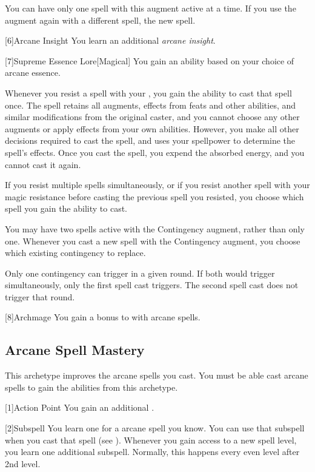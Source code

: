         You can have only one spell with this augment active at a time.
        If you use the augment again with a different spell, the new spell.

        [6]{Arcane Insight}
        You learn an additional \textit{arcane insight}.

        [7]{Supreme Essence Lore}[Magical]
        You gain an ability based on your choice of arcane essence.

         Whenever you resist a spell with your , you gain the ability to cast that spell once.
        The spell retains all augments, effects from feats and other abilities, and similar modifications from the original caster, and you cannot choose any other augments or apply effects from your own abilities.
        However, you make all other decisions required to cast the spell, and uses your spellpower to determine the spell's effects.
        Once you cast the spell, you expend the absorbed energy, and you cannot cast it again.

        If you resist multiple spells simultaneously, or if you resist another spell with your magic resistance before casting the previous spell you resisted, you choose which spell you gain the ability to cast.

         You may have two spells active with the Contingency augment, rather than only one.
        Whenever you cast a new spell with the Contingency augment, you choose which existing contingency to replace.

        Only one contingency can trigger in a given round.
        If both would trigger simultaneously, only the first spell cast triggers.
        The second spell cast does not trigger that round.

        [8]{Archmage}
        You gain a  bonus to  with arcane spells.

    \subsection{Arcane Spell Mastery}
        This archetype improves the arcane spells you cast.
        You must be able cast arcane spells to gain the abilities from this archetype.

        [1]{Action Point}
        You gain an additional .

        [2]{Subspell}
        You learn one  for a arcane spell you know.
        You can use that subspell when you cast that spell (see ).
        Whenever you gain access to a new spell level, you learn one additional subspell.
        Normally, this happens every even level after 2nd level.

